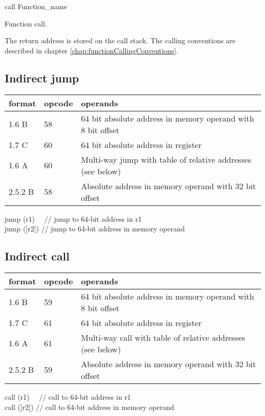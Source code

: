 \documentclass[forwardcom.tex]{subfiles}
\begin{document}
call Function\_name
\vv

Function call.
\vv

The return address is stored on the call stack. The calling conventions are described in chapter \ref{chap:functionCallingConventions}.
\vv


\subsection{Indirect jump}

\label{table:indirectJumpInstruction}
\begin{tabular}{|p{14mm}|p{12mm}|p{110mm}|}
\hline
\bfseries format & \bfseries opcode & \bfseries operands \\ \hline
1.6 B & 58 & 64 bit absolute address in memory operand with 8 bit offset \\ \hline
1.7 C & 60 & 64 bit absolute address in register \\ \hline
1.6 A & 60 & Multi-way jump with table of relative addresses (see below) \\ \hline
2.5.2 B & 58 & Absolute address in memory operand with 32 bit offset \\ \hline
\end{tabular}
\vv

{\ttfamily
jump (r1) \ \ // jump to 64-bit address in r1 \\
jump ([r2]) // jump to 64-bit address in memory operand
}
\vv

\subsection{Indirect call}
\label{table:IndirectCallInstruction}
\begin{tabular}{|p{14mm}|p{12mm}|p{110mm}|}
\hline
\bfseries format & \bfseries opcode & \bfseries operands \\ \hline
1.6 B & 59 & 64 bit absolute address in memory operand with 8 bit offset \\ \hline
1.7 C & 61 & 64 bit absolute address in register \\ \hline
1.6 A & 61 & Multi-way call with table of relative addresses (see below) \\ \hline
2.5.2 B & 59 & Absolute address in memory operand with 32 bit offset \\ \hline
\end{tabular}
\vv

{\ttfamily
call (r1) \ \ // call to 64-bit address in r1 \\
call ([r2]) // call to 64-bit address in memory operand
}
\vv
\end{document}
